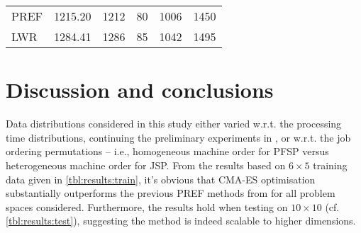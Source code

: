\documentclass[graybox]{svmult}
\begin{document}
\begin{table}[]
{\begin{tabular}{lrrrrr}
            PREF&  1215.20 & 1212 & 80 & 1006 & 1450  \\ %
            LWR &  1284.41 & 1286 & 85 & 1042 & 1495   \\ %
            \bottomrule \end{tabular}}
    \quad
    \quad
    
\end{table}

\section{Discussion and conclusions}\label{sec:disc}
Data distributions considered in this study either varied 
w.r.t. the processing time distributions, continuing the preliminary 
experiments in  \cite{InRu11a} , or 
w.r.t. the job ordering permutations -- i.e., homogeneous machine order for 
PFSP versus heterogeneous machine order for JSP. 
From the results based on $6\times5$ training data given  in 
\cref{tbl:results:train}, it's obvious that CMA-ES optimisation substantially 
outperforms the previous PREF methods from \cite{InRu11a} for all problem 
spaces considered. Furthermore, the results hold when testing on $10\times10$ 
(cf. \cref{tbl:results:test}), suggesting the method is indeed scalable to 
higher dimensions. 
\end{document}
